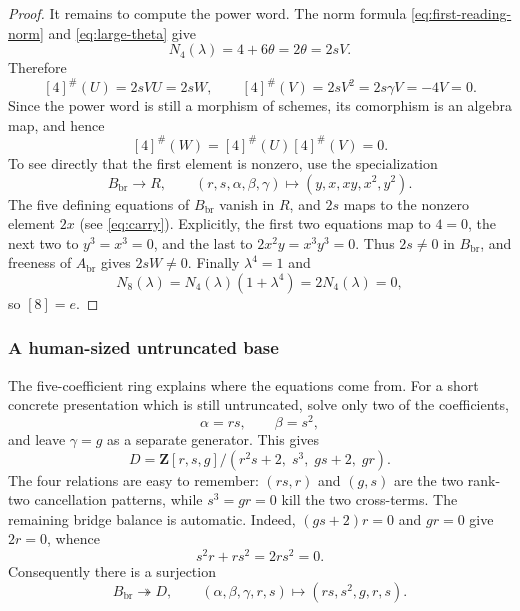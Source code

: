 \documentclass[11pt]{article}
\theoremstyle{remark}
\newcommand{\Z}{\mathbf Z}
\begin{document}
\begin{proof}
It remains to compute the power word.  The norm formula
\eqref{eq:first-reading-norm} and \eqref{eq:large-theta} give
\[
 N_4(\lambda)=4+6\theta=2\theta=2sV.
\]
Therefore
\[
 [4]^\#(U)=2sVU=2sW,
 \qquad
 [4]^\#(V)=2sV^2=2s\gamma V=-4V=0.
\]
Since the power word is still a morphism of schemes, its comorphism is an
algebra map, and hence
\[
 [4]^\#(W)=[4]^\#(U)[4]^\#(V)=0.
\]
To see directly that the first element is nonzero, use the specialization
\begin{equation}\label{eq:large-specialization-in-proof}
 B_{\mathrm{br}}\longrightarrow R,\qquad
 (r,s,\alpha,\beta,\gamma)\longmapsto(y,x,xy,x^2,y^2).
\end{equation}
The five defining equations of $B_{\mathrm{br}}$ vanish in $R$, and $2s$
maps to the nonzero element $2x$ (see \eqref{eq:carry}).  Explicitly, the
first two equations map to $4=0$,
the next two to $y^3=x^3=0$, and the last to
$2x^2y=x^3y^3=0$.  Thus $2s\ne0$ in $B_{\mathrm{br}}$, and freeness of
$A_{\mathrm{br}}$ gives
$2sW\ne0$.  Finally
$\lambda^4=1$ and
\[
 N_8(\lambda)=N_4(\lambda)(1+\lambda^4)=2N_4(\lambda)=0,
\]
so $[8]=e$.
\end{proof}

\subsubsection*{A human-sized untruncated base}

The five-coefficient ring explains where the equations come from.  For a
short concrete presentation which is still untruncated, solve only two of
the coefficients,
\[
 \alpha=rs,\qquad \beta=s^2,
\]
and leave $\gamma=g$ as a separate generator.  This gives
\begin{equation}\label{eq:three-coefficient-base}
 D=\Z[r,s,g]/(r^2s+2,\;s^3,\;gs+2,\;gr).
\end{equation}
The four relations are easy to remember: $(rs,r)$ and $(g,s)$ are the two
rank-two cancellation patterns, while $s^3=gr=0$ kill the two cross-terms.
The remaining bridge balance is automatic.  Indeed, $(gs+2)r=0$ and
$gr=0$ give $2r=0$, whence
\[
 s^2r+rs^2=2rs^2=0.
\]
Consequently there is a surjection
\begin{equation}\label{eq:bridge-to-D}
 B_{\mathrm{br}}\twoheadrightarrow D,
 \qquad
 (\alpha,\beta,\gamma,r,s)\longmapsto(rs,s^2,g,r,s).
\end{equation}
\end{document}
